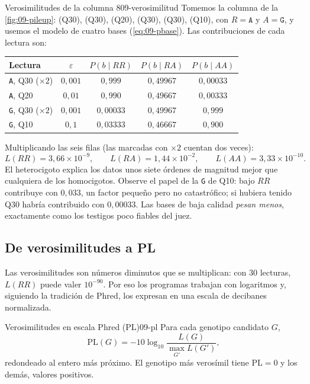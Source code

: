 \begin{ejemplo}{Verosimilitudes de la columna 8}{09-verosimilitud}
Tomemos la columna de la \cref{fig:09-pileup}: (Q30), (Q30), (Q20), (Q30), (Q30), (Q10), con $R=\texttt{A}$ y $A=\texttt{G}$, y usemos el modelo de cuatro bases (\cref{eq:09-pbase}). Las contribuciones de cada lectura son:
\begin{center}
\small
\begin{tabular}{@{}lcccc@{}}
\toprule
Lectura & $\varepsilon$ & $P(b\mid RR)$ & $P(b\mid RA)$ & $P(b\mid AA)$\\
\midrule
\texttt{A}, Q30 ($\times2$) & $0{,}001$ & $0{,}999$ & $0{,}49967$ & $0{,}00033$\\
\texttt{A}, Q20 & $0{,}01$ & $0{,}990$ & $0{,}49667$ & $0{,}00333$\\
\texttt{G}, Q30 ($\times2$) & $0{,}001$ & $0{,}00033$ & $0{,}49967$ & $0{,}999$\\
\texttt{G}, Q10 & $0{,}1$ & $0{,}03333$ & $0{,}46667$ & $0{,}900$\\
\bottomrule
\end{tabular}
\end{center}
Multiplicando las seis filas (las marcadas con $\times2$ cuentan dos veces):
\[
L(RR)=3{,}66\times10^{-9},\qquad L(RA)=1{,}44\times10^{-2},\qquad L(AA)=3{,}33\times10^{-10}.
\]
El heterocigoto explica los datos unos siete órdenes de magnitud mejor que cualquiera de los homocigotos. Observe el papel de la \texttt{G} de Q10: bajo $RR$ contribuye con $0{,}033$, un factor pequeño pero no catastrófico; si hubiera tenido Q30 habría contribuido con $0{,}00033$. Las bases de baja calidad \emph{pesan menos}, exactamente como los testigos poco fiables del juez.
\end{ejemplo}

\subsection{De verosimilitudes a PL}

Las verosimilitudes son números diminutos que se multiplican: con 30 lecturas, $L(RR)$ puede valer $10^{-90}$. Por eso los programas trabajan con logaritmos y, siguiendo la tradición de Phred, los expresan en una escala de decibanes normalizada.

\begin{definicion}{Verosimilitudes en escala Phred (PL)}{09-pl}
Para cada genotipo candidato $G$,
\begin{equation}\label{eq:09-pl}
\mathrm{PL}(G) = -10\log_{10}\frac{L(G)}{\max_{G'} L(G')},
\end{equation}
redondeado al entero más próximo. El genotipo más verosímil tiene $\mathrm{PL}=0$ y los demás, valores positivos.
\end{definicion}

